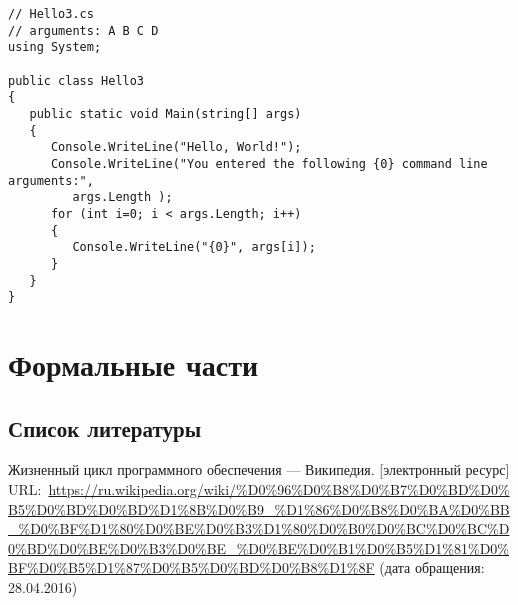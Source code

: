 \documentclass[a4paper,14pt,final]{extreport}
\begin{document}
\begin{verbatim}
// Hello3.cs
// arguments: A B C D
using System;

public class Hello3
{
   public static void Main(string[] args)
   {
      Console.WriteLine("Hello, World!");
      Console.WriteLine("You entered the following {0} command line arguments:",
         args.Length );
      for (int i=0; i < args.Length; i++)
      {
         Console.WriteLine("{0}", args[i]);
      }
   }
}
\end{verbatim}

\chapter{Формальные части}
\label{cha:formal}

\section{Список литературы}
\label{sec:refs}

\begin{thebibliography}{99}
 Жизненный цикл программного обеспечения --- Википедия. [электронный ресурс] URL:~\url{https://ru.wikipedia.org/wiki/%D0%96%D0%B8%D0%B7%D0%BD%D0%B5%D0%BD%D0%BD%D1%8B%D0%B9_%D1%86%D0%B8%D0%BA%D0%BB_%D0%BF%D1%80%D0%BE%D0%B3%D1%80%D0%B0%D0%BC%D0%BC%D0%BD%D0%BE%D0%B3%D0%BE_%D0%BE%D0%B1%D0%B5%D1%81%D0%BF%D0%B5%D1%87%D0%B5%D0%BD%D0%B8%D1%8F} (дата обращения: 28.04.2016)
\end{thebibliography}
\end{document}
